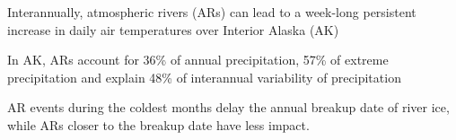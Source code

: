 \documentclass[12pts,draft]{AR_analysis_}
\begin{document}

\begin{keypoints}

\item Interannually, atmospheric rivers (ARs) can lead to a week-long persistent 
	increase in daily air temperatures over Interior Alaska (AK)

\item In AK, ARs account for 36\% of annual precipitation, 57\% of extreme 
	precipitation and explain 48\% of interannual variability of precipitation

\item AR events during the coldest months delay the annual breakup date of 
	river ice, while ARs closer to the breakup date have less impact.

\end{keypoints}

%
%

%
%

\end{document}
